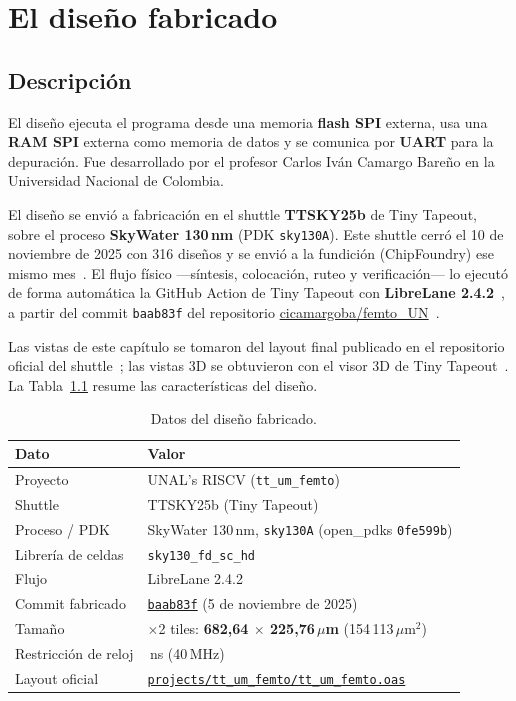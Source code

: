 \documentclass[11pt,letterpaper,oneside]{report}
\newcommand{\um}{\ensuremath{\mu}m}
\newcommand{\code}[1]{\texttt{#1}}
\begin{document}
\chapter{El diseño fabricado}
\label{cap:fabricado}

\section{Descripción}

El diseño ejecuta el programa desde una memoria \textbf{flash SPI} externa, usa una \textbf{RAM SPI} externa como memoria de datos y se comunica por \textbf{UART} para la depuración. Fue desarrollado por el profesor Carlos Iván Camargo Bareño en la Universidad Nacional de Colombia.

El diseño se envió a fabricación en el shuttle \textbf{TTSKY25b} de Tiny Tapeout, sobre el proceso \textbf{SkyWater 130\,nm} (PDK \code{sky130A}). Este shuttle cerró el 10 de noviembre de 2025 con 316 diseños y se envió a la fundición (ChipFoundry) ese mismo mes~\cite{ttsky25b_news}. El flujo físico ---síntesis, colocación, ruteo y verificación--- lo ejecutó de forma automática la GitHub Action de Tiny Tapeout con \textbf{LibreLane 2.4.2}~\cite{gds_run}, a partir del commit \code{baab83f} del repositorio \href{https://github.com/cicamargoba/femto_UN}{cicamargoba/femto\_UN}~\cite{repo_femto}.

Las vistas de este capítulo se tomaron del layout final publicado en el repositorio oficial del shuttle~\cite{repo_shuttle}; las vistas 3D se obtuvieron con el visor 3D de Tiny Tapeout~\cite{tt_chip}. La Tabla~\ref{tab:datos} resume las características del diseño.

\begin{table}[htbp]
\centering
\caption{Datos del diseño fabricado.}
\label{tab:datos}
\begin{tabular}{>{\raggedright\arraybackslash}p{4.6cm} >{\raggedright\arraybackslash}p{9.8cm}}
\toprule
\textbf{Dato} & \textbf{Valor} \\
\midrule
Proyecto & UNAL's RISCV (\code{tt\_um\_femto}) \\
Shuttle & TTSKY25b (Tiny Tapeout) \\
Proceso / PDK & SkyWater 130\,nm, \code{sky130A} (open\_pdks \code{0fe599b}) \\
Librería de celdas & \code{sky130\_fd\_sc\_hd} \\
Flujo & LibreLane 2.4.2 \\
Commit fabricado & \href{https://github.com/cicamargoba/femto_UN/commit/baab83f5b7fe16083744b88fc54fe699873517e1}{\code{baab83f}} (5 de noviembre de 2025) \\
Tamaño & 4$\times$2 tiles: \textbf{682,64 $\times$ 225,76\,\um} (154\,113\,\um$^2$) \\
Restricción de reloj & 25\,ns (40\,MHz) \\
Layout oficial & \href{https://github.com/TinyTapeout/tinytapeout-sky-25b/tree/main/projects/tt_um_femto}{\code{projects/tt\_um\_femto/tt\_um\_femto.oas}} \\
\bottomrule
\end{tabular}
\end{table}
\end{document}
